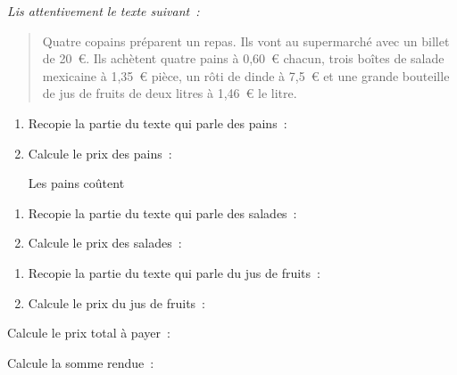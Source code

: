 {\em Lis attentivement le texte suivant :}
\begin{quote}
Quatre copains préparent un repas. Ils vont au supermarché avec un
billet de 20~\textgreek{\euro}. Ils achètent quatre pains à
0,60~\textgreek{\euro} chacun, trois boîtes de salade mexicaine à
1,35~\textgreek{\euro} pièce, un rôti de dinde à 7,5~\textgreek{\euro}
et une grande bouteille de jus de fruits de deux litres à
1,46~\textgreek{\euro} le litre.
\end{quote}
\begin{myenumerate}
  \item
    \begin{enumerate}
    \item Recopie la partie du texte qui parle des pains :
\par\dotfill\par\dotfill
\item Calcule le prix des pains :
\par\dotfill\par\dotfill
\par Les pains coûtent \dotfill
    \end{enumerate}
  \item
    \begin{enumerate}
    \item  Recopie la partie du texte qui parle des salades :
\par\dotfill\par\dotfill
\item Calcule le prix des salades :
\par\dotfill\par\dotfill
    \end{enumerate}
  \item
    \begin{enumerate}
    \item Recopie la partie du texte qui parle du jus de fruits :
\par\dotfill\par\dotfill
\item Calcule le prix du jus de fruits :
\par\dotfill\par\dotfill
    \end{enumerate}
  \item Calcule le prix total à payer :
\par\dotfill\par\dotfill
\item Calcule la somme rendue :
\par\dotfill\par\dotfill
\end{myenumerate}